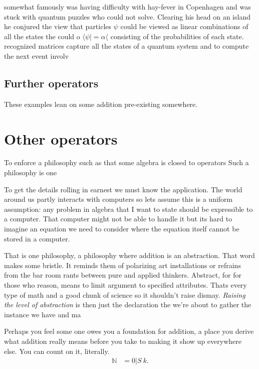 somewhat famously 
was having difficulty with hay-fever in Copenhagen and was stuck with 
quantum puzzles who could not solve. Clearing his head on an island 
he conjured the view that particles $\psi$ could be viewed as linear 
combinations of all the states the could o
$\langle \psi|=\alpha \langle $ consisting of the probabilities of each state.
recognized matrices capture all the states of a quantum system and 
to compute the next event involv



\subsection{Further operators}




These examples lean on some addition pre-existing somewhere.  





\section*{Other operators}



To enforce a philosophy such as that some algebra is closed to 
operators 
Such a philosophy is one 


To get the details rolling in earnest we must know the application.
The world around us partly interacts with computers so lets assume 
this is a uniform assumption: any problem in algebra that I want to 
state should be expressible to a computer.  That computer might not 
be able to handle it but its hard to imagine an equation we need 
to consider where the equation itself cannot be stored in a computer.




That is one philosophy, a philosophy where addition is an abstraction.
That word makes some bristle.  It reminds them of polarizing art 
installations or refrains from the bar room rants between pure and 
applied thinkers.  Abstract, for for those who reason, means to limit 
argument to specified attributes.  Thats every type of math and a good 
chunk of science so it shouldn't raise dismay.  \emph{Raising the level of 
abstraction} is then just the declaration the we're about to gather the 
instance we have and ma

Perhaps you feel some one owes you a foundation for addition, 
a place you derive what addition really means before you 
take to making it show up everywhere else.
You can count on it, literally.
\begin{align*}
    \mathbb{N} & = 0 | S~k.
\end{align*}


